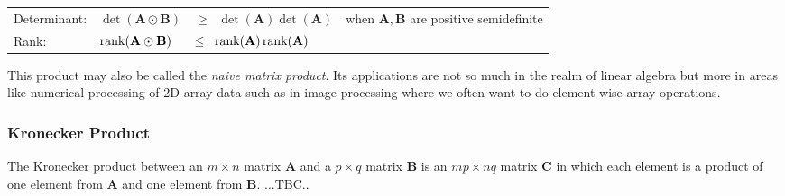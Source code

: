 \medskip
\begin{tabular}{l l l l}
Determinant: & $\det(\mathbf{A} \odot \mathbf{B})$ 
             & $\geq \;\; \det(\mathbf{A})  \det(\mathbf{A})$   
             & when $\mathbf{A,B}$ are positive semidefinite \\
Rank:        & $\operatorname{rank}(\mathbf{A} \odot \mathbf{B}) $
             & $\leq \;\; \operatorname{rank}(\mathbf{A}) \operatorname{rank}(\mathbf{A})$     \\
\end{tabular}
\medskip

This product may also be called the \emph{naive matrix product}. Its applications are not so much in the realm of linear algebra but more in areas like numerical processing of 2D array data such as in image processing where we often want to do element-wise array operations. 



\subsubsection{Kronecker Product} The Kronecker product between an $m \times n$ matrix $\mathbf{A}$ and a $p \times q$ matrix $\mathbf{B}$ is an $mp \times nq$ matrix $\mathbf{C}$ in which each element is a product of one element from $\mathbf{A}$ and one element from $\mathbf{B}$. ...TBC..





